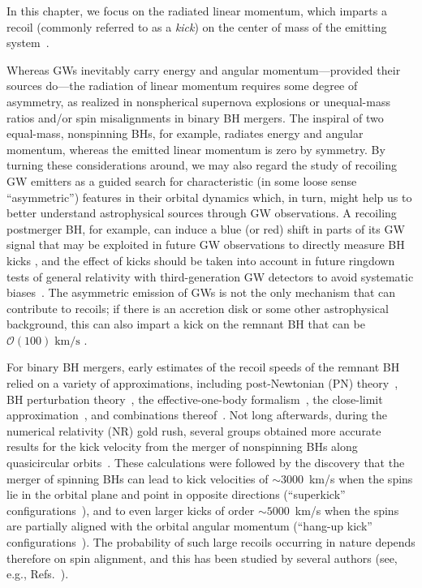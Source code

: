 In this chapter, we focus on the radiated linear momentum, which
imparts a recoil (commonly referred to as a \emph{kick}) on the center
of mass of the emitting
system~\cite{Bonnor1961-wy,Peres:1962zz,Bekenstein:1973zz}.

Whereas GWs inevitably carry energy and angular momentum---provided
their sources do---the radiation of linear momentum requires some
degree of asymmetry, as realized in nonspherical supernova explosions
or unequal-mass ratios and/or spin misalignments in binary BH
mergers. The inspiral of two equal-mass, nonspinning BHs, for example,
radiates energy and angular momentum, whereas the emitted linear
momentum is zero by symmetry. By turning these considerations around,
we may also regard the study of recoiling GW emitters as a guided
search for characteristic (in some loose sense ``asymmetric'')
features in their orbital dynamics which, in turn, might help us to
better understand astrophysical sources through GW observations.
A recoiling postmerger BH, for example, can induce a blue (or
red) shift in parts of its GW signal that may be exploited in future
GW observations to directly measure BH kicks
\cite{Gerosa:2016vip,CalderonBustillo:2018zuq,Lousto:2019lyf}, and
the effect of kicks should be taken into account in future ringdown
tests of general relativity with third-generation GW detectors to
avoid systematic biases~\cite{Varma:2020nbm}.
The asymmetric emission of GWs is not the only mechanism that
can contribute to recoils; if there is an accretion disk or some other
astrophysical background, this can also impart a kick on the remnant
BH that can be $\mathcal{O}(100)\;\mathrm{km/s}$ \cite{Cardoso:2020lxx}.

For binary BH mergers, early estimates of the recoil speeds of the
remnant BH relied on a variety of approximations, including
post-Newtonian (PN) theory~\cite{Fitchett1983-xq,Blanchet:2005rj}, BH
perturbation theory~\cite{Hughes:2004ck}, the effective-one-body
formalism~\cite{Damour:2006tr}, the close-limit
approximation~\cite{Sopuerta:2006wj,Sopuerta:2006et}, and combinations
thereof~\cite{LeTiec:2009yg}. Not long afterwards, during the
numerical relativity (NR) gold rush, several groups obtained more
accurate results for the kick velocity from the merger of nonspinning
BHs along
quasicircular
orbits~\cite{Baker:2006vn,Gonzalez:2006md,Herrmann:2007cwl}.
These calculations were followed by the discovery that the merger of
spinning BHs can lead to kick velocities of $\sim 3000$~km/s when the
spins lie in the orbital plane and point in opposite directions
(``superkick''
configurations~\cite{Gonzalez:2007hi,Campanelli:2007cga,Campanelli:2007ew}),
and to even larger kicks of order $\sim 5000$~km/s when the spins are
partially aligned with the orbital angular momentum (``hang-up kick''
configurations~\cite{Lousto:2011kp}).
The probability of such large
recoils occurring in nature depends therefore on spin alignment, and
this has been studied by several authors (see, e.g.,
Refs.~\cite{Schnittman:2007sn,Dotti:2009vz,Kesden:2010ji,Lousto:2012su,Berti:2012zp,Lousto:2012su}).

